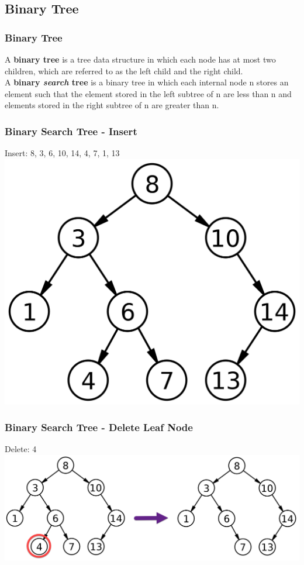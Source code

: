\subsection{Binary Tree}
\begin{frame}[fragile]
\frametitle{Binary Tree}
A {\bf binary tree} is a tree data structure in which each node has at most two children, which are referred to as the left child and the right child.\\
A {\bf binary \emph{search} tree} is a binary tree in which each internal node n stores an
element such that the element stored in the left subtree of n are less than n and
elements stored in the right subtree of n are greater than n.
\end{frame}

\begin{frame}[fragile]
\frametitle{Binary Search Tree - Insert}
Insert: 8, 3, 6, 10, 14, 4, 7, 1, 13\\
\vspace{3mm}
\includegraphics[scale=0.05]{img/binarytree_2.png}
\end{frame}

\begin{frame}[fragile]
\frametitle{Binary Search Tree - Delete Leaf Node}
Delete: 4\\
\vspace{3mm}
\includegraphics[scale=0.14]{img/tree2.png}
\end{frame}

